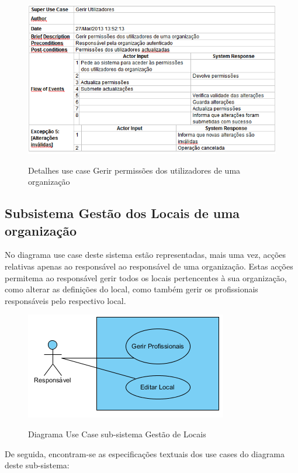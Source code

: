 \documentclass[12pt,a4paper]{article}
\begin{document}
\begin{figure}[h!]
\centering
\includegraphics[scale=0.7]{d_usecase/R_permissoes}
\label{usecase}
\caption{Detalhes use case Gerir permissões dos utilizadores de uma organização}
\end{figure}

\clearpage
\clearpage

\subsection{Subsistema Gestão dos Locais de uma organização}
No diagrama use case deste sistema estão representadas, mais uma vez, acções relativas
apenas ao responsável ao responsável de uma organização. Estas acções permitema ao responsável gerir todos os locais pertencentes à sua organização, como alterar as definições do local, como também gerir os profissionais responsáveis pelo respectivo local.\\

\begin{figure}[h!]
\centering
\includegraphics[scale=1]{usecase/R_GerirLocal}
\label{usecase}
\caption{Diagrama Use Case sub-sistema Gestão de Locais}
\end{figure}

De seguida, encontram-se as especificações textuais dos use cases do diagrama deste sub-sistema:\\
\end{document}
